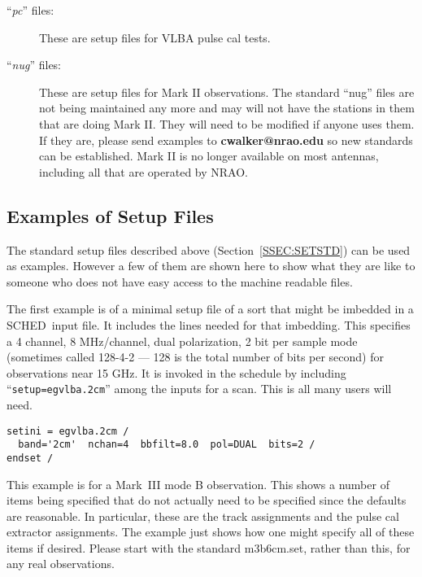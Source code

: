 \documentclass{report}
\newcommand{\schedb}{{\sc SCHED~}}
\begin{document}
\begin{description}
\item[``{\sl pc}'' files:] These are setup files for VLBA pulse cal
tests.

\item[``{\sl nug}'' files:]  These are setup files for Mark II
observations.  The standard ``nug'' files are not being maintained any
more and may will not have the stations in them that are doing Mark
II.  They will need to be modified if anyone uses them.  If they are,
please send examples to {\bf cwalker@nrao.edu} so new standards can be
established.  Mark II is no longer available on most antennas,
including all that are operated by NRAO.

\end{description}



\subsection{\label{SSEC:SETEGS}Examples of Setup Files}

The standard setup files described above (Section~\ref{SSEC:SETSTD})
can be used as examples.  However a few of them are shown here
to show what they are like to someone who does not have easy access
to the machine readable files.

\newpage

  The first example is of a minimal setup file of a sort that might be
imbedded in a \schedb input file.  It includes the lines needed for
that imbedding.  This specifies a 4 channel, 8 MHz/channel, dual
polarization, 2 bit per sample mode (sometimes called 128-4-2 --- 128
is the total number of bits per second) for observations near 15 GHz.
It is invoked in the schedule by including ``{\tt setup=egvlba.2cm}''
among the inputs for a scan.  This is all many users will need.

\begin{verbatim}
setini = egvlba.2cm /
  band='2cm'  nchan=4  bbfilt=8.0  pol=DUAL  bits=2 /
endset /
\end{verbatim}

\newpage

This example is for a Mark~III mode B observation.  This shows a
number of items being specified that do not actually need to be
specified since the defaults are reasonable.  In particular, these
are the track assignments and the pulse cal extractor assignments.
The example just shows how one might specify all of these items
if desired.  Please start with the standard m3b6cm.set, rather than
this, for any real observations.
\end{document}
